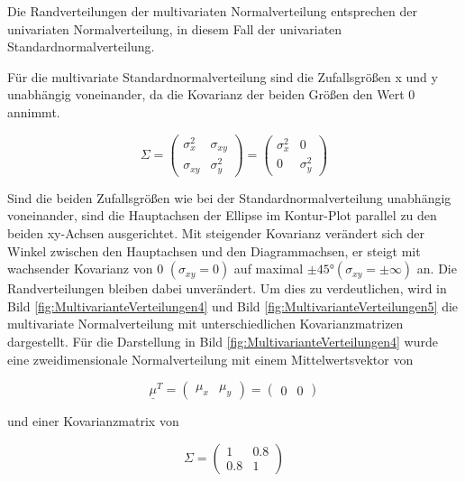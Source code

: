 \noindent Die Randverteilungen der multivariaten Normalverteilung entsprechen der univariaten Normalverteilung, in diesem Fall der univariaten Standardnormalverteilung.\newline

\noindent F\"{u}r die multivariate Standardnormalverteilung sind die Zufallsgr\"{o}{\ss}en x und y unabh\"{a}ngig voneinander, da die Kovarianz der beiden Gr\"{o}{\ss}en den Wert 0 annimmt.

\begin{equation}\label{eq:eighteightythree}
\Sigma =\left(\begin{array}{cc} {\sigma _{x}^{2}} & {\sigma _{xy}} \\ {\sigma _{xy}} & {\sigma _{y}^{2}} \end{array}\right)=\left(\begin{array}{cc} {\sigma _{x}^{2}} & {0} \\ {0} & {\sigma _{y}^{2}} \end{array}\right)
\end{equation}

\noindent Sind die beiden Zufallsgr\"{o}{\ss}en wie bei der Standardnormalverteilung unabh\"{a}ngig voneinander, sind die Hauptachsen der Ellipse im Kontur-Plot parallel zu den beiden xy-Achsen ausgerichtet. Mit steigender Kovarianz ver\"{a}ndert sich der Winkel zwischen den Hauptachsen und den Diagrammachsen, er steigt mit wachsender Kovarianz von 0 $(\sigma_{xy} = 0)$ auf maximal $\pm 45\si{\degree} (\sigma_{xy} = \pm \infty)$ an. Die Randverteilungen bleiben dabei unver\"{a}ndert. Um dies zu verdeutlichen, wird in Bild \ref{fig:MultivarianteVerteilungen4} und Bild \ref{fig:MultivarianteVerteilungen5} die multivariate Normalverteilung mit unterschiedlichen Kovarianzmatrizen dargestellt. F\"{u}r die Darstellung in Bild \ref{fig:MultivarianteVerteilungen4} wurde eine zweidimensionale Normalverteilung mit einem Mittelwertsvektor von

\begin{equation}\label{eq:eighteightyfour}
\underline{\mu }^{T} =\left(\begin{array}{cc} {\mu _{x} } & {\mu _{y} } \end{array}\right)=\left(\begin{array}{cc} {0} & {0} \end{array}\right)
\end{equation}

\noindent und einer Kovarianzmatrix von

\begin{equation}\label{eq:eighteightyfive}
\Sigma =\left(\begin{array}{cc} {1} & {0.8} \\ {0.8} & {1} \end{array}\right)
\end{equation}

